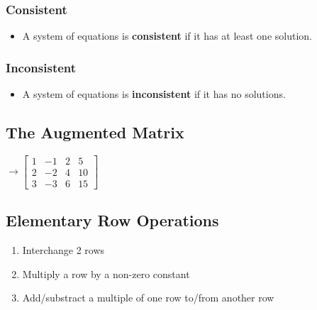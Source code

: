 \documentclass[
  letterpaper,
  DIV=11,
  numbers=noendperiod]{scrartcl}
\providecommand{\tightlist}{%
  \setlength{\itemsep}{0pt}\setlength{\parskip}{0pt}}\usepackage{longtable,booktabs,array}
\begin{document}
\begin{multicols}{2}
  \hypertarget{review-solve-the-following-systems}{%
  \subsubsection{Consistent}\label{consistent}}

  \begin{itemize}
    \tightlist
    \item A system of equations is \textbf{consistent} if it has at least one solution.
  \end{itemize}

\columnbreak

  \hypertarget{review-solve-the-following-systems}{%
  \subsubsection{Inconsistent}\label{inconsistent}}

  \begin{itemize}
    \tightlist
    \item A system of equations is \textbf{inconsistent} if it has no solutions.
  \end{itemize}

\end{multicols}

\newpage{}

\subsection{The Augmented Matrix}\label{the-augmented-matrix}

\Large{}
\(\longrightarrow \left[\begin{array}{ccc|c}1 & -1 & 2 & 5 \\ 2 & -2 & 4 & 10 \\ 3 & -3 & 6 & 15 \end{array}\right]\)
\normalsize

\subsection{Elementary Row Operations}\label{elementary-row-operations}

\begin{enumerate}
\def\labelenumi{\arabic{enumi}.}
\tightlist
\item
  Interchange 2 rows
\item
  Multiply a row by a non-zero constant
\item
  Add/substract a multiple of one row to/from another row
\end{enumerate}
\end{document}
